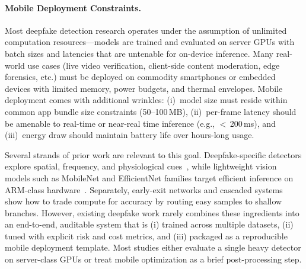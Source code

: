\paragraph{Mobile Deployment Constraints.}
Most deepfake detection research operates under the assumption of unlimited computation resources---models are trained and evaluated on server GPUs with batch sizes and latencies that are untenable for on\hyp device inference. Many real\hyp world use cases (live video verification, client\hyp side content moderation, edge forensics, etc.) must be deployed on commodity smartphones or embedded devices with limited memory, power budgets, and thermal envelopes. Mobile deployment comes with additional wrinkles: (i)~model size must reside within common app bundle size constraints (50--100\,MB), (ii)~per\hyp frame latency should be amenable to real\hyp time or near\hyp real time inference (e.g., $<$\,200\,ms), and (iii)~energy draw should maintain battery life over hours\hyp long usage.

Several strands of prior work are relevant to this goal. Deepfake\hyp specific detectors explore spatial, frequency, and physiological cues~\cite{pei2024deepfakesurvey,durall2020watch,qian2020thinkingfrequency}, while lightweight vision models such as MobileNet and EfficientNet families target efficient inference on ARM\hyp class hardware~\cite{mobilenetv4,efficientnetv2,zhang2018shufflenet,ma2018shufflenetv2}. Separately, early\hyp exit networks and cascaded systems~\cite{teerapittayanon2017branchynet,huang2018msdnet,kaya2019shallowdeep} show how to trade compute for accuracy by routing easy samples to shallow branches. However, existing deepfake work rarely combines these ingredients into an end\hyp to\hyp end, auditable system that is (i) trained across multiple datasets, (ii) tuned with explicit risk and cost metrics, and (iii) packaged as a reproducible mobile deployment template. Most studies either evaluate a single heavy detector on server\hyp class GPUs or treat mobile optimization as a brief post\hyp processing step.

